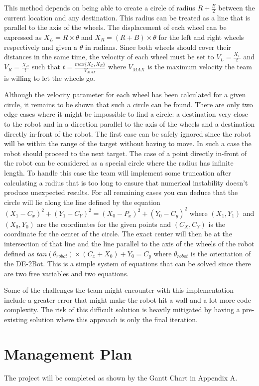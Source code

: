 \documentclass[11pt,conference,onecolumn]{article} %
\begin{document}
This method depends on being able to create a circle of radius $R+\frac{B}{2}$ between the current location and any destination. This radius can be treated as a line that is parallel to the axis of the wheels. The displacement of each wheel can be expressed as $X_{L} = R \times \theta$ and $X_{R} = (R + B) \times \theta$ for the left and right wheels respectively and given a $\theta$ in radians. Since both wheels should cover their distances in the same time, the velocity of each wheel must be set to $V_{L} = \frac{X_{L}}{t}$ and  $V_{R} = \frac{X_{R}}{t}$ such that $t  = \frac{max\{X_{L}, X_{R}\}}{V_{MAX}}$ where $V_{MAX}$ is the maximum velocity the team is  willing to let the wheels go.\par
Although the velocity parameter for each wheel has been calculated for a given circle, it remains to be shown that such a circle can be found. There are only two edge cases where it might be impossible to find a circle: a destination very close to the robot and in a direction parallel to the axis of the wheels and a destination directly in-front of the robot. The first case can be safely ignored since the robot will be within the range of the target without having to move. In such a case the robot should proceed to the next target. The case of a point directly in-front of the robot can be considered as a special circle where the radius has infinite length. To handle this case the team will implement some truncation after calculating a radius that is too long to ensure that numerical instability doesn't produce unexpected results. For all remaining cases you can deduce that the circle will lie along the line defined by the equation $(X_1 - C_x)^2 + (Y_1 - C_Y)^2 = (X_0 - P_x)^2 + (Y_0 - C_y)^2$ where $(X_1,Y_1)$ and $(X_0,Y_0)$ are the coordinates for the given points and $(C_X,C_Y)$ is the coordinate for the center of the circle. The exact center will then be at the intersection of that line and the line parallel to the axis of the wheels of the robot defined as $tan(\theta_{robot}) \times (C_x + X_0) + Y_0 = C_y$ where $\theta_{robot}$ is the orientation of the DE-2Bot. This is a simple system of equations that can be solved since there are two free variables and two equations.\par
Some of the challenges the team might encounter with this implementation include a greater error that might make the robot hit a wall and a lot more code complexity. The risk of this difficult solution is heavily mitigated by having a pre-existing solution where this approach is only the final iteration.
\section*{Management Plan}
The project will be completed as shown by the Gantt Chart in Appendix A.
\end{document}
